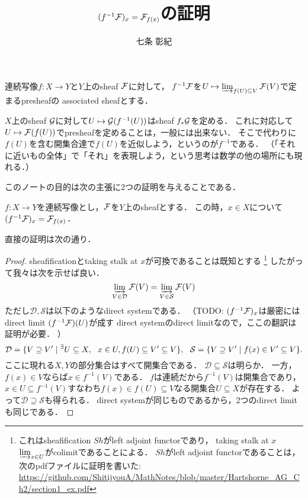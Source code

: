 \documentclass[a4paper]{jsarticle}
\title{$(f^{-1}\mathcal{F})_x=\mathcal{F}_{f(x)}$の証明}
\author{七条 彰紀}
\newcommand{\ftorSh}{\mathit{Sh}}
\begin{document}
\maketitle

\begin{Def}
    連続写像$f: X \to Y$と$Y$上のsheaf $\mathcal{F}$に対して，
    $f^{-1} \mathcal{F}$を$U \mapsto \varinjlim_{f(U) \subseteq V} \mathcal{F}(V)$で定まるpresheafの
    associated sheafとする．
\end{Def}

$X$上のsheaf $\mathcal{G}$に対して$U \mapsto \mathcal{G}(f^{-1}(U))$はsheaf $f_*\mathcal{G}$を定める．
これに対応して$U \mapsto \mathcal{F}(f(U))$でpresheafを定めることは，一般には出来ない．
そこで代わりに$f(U)$を含む開集合達で$f(U)$を近似しよう，というのが$f^{-1}$である．
（「それに近いもの全体」で「それ」を表現しよう，という思考は数学の他の場所にも現れる．）

このノートの目的は次の主張に$2$つの証明を与えることである．
\begin{Prop}[$*$]
    $f: X \to Y$を連続写像とし，$\mathcal{F}$を$Y$上のsheafとする．
    この時，$x \in X$について$(f^{-1}\mathcal{F})_x=\mathcal{F}_{f(x)}$．
\end{Prop}

直接の証明は次の通り．
\begin{proof}
    sheafificationとtaking stalk at $x$が可換であることは既知とする
    \footnote
    {
        これはsheafification $\ftorSh$がleft adjoint functorであり，
        taking stalk at $x$ $\varinjlim_{x \in U}$がcolimitであることによる．
        $\ftorSh$がleft adjoint functorであることは，
        次のpdfファイルに証明を書いた:
        \url{https://github.com/ShitijyouA/MathNotes/blob/master/Hartshorne_AG_Ch2/section1_ex.pdf}
    }
    したがって我々は次を示せば良い．
    \[ \varinjlim_{V \in \mathcal{D}} \mathcal{F}(V)=\varinjlim_{V \in \mathcal{S}} \mathcal{F}(V) \]
    ただし$\mathcal{D}, \mathcal{S}$は以下のようなdirect systemである．
    （TODO:
        $(f^{-1}\mathcal{F})_x$は厳密にはdirect limit $(f^{-1}\mathcal{F})(U)$が成す
        direct systemのdirect limitなので，ここの翻訳は証明が必要．
    ）
    \[
        \mathcal{D}=\{ V \supseteq V' \mid {}^{\exists} U \subseteq X,~~ x \in U, f(U) \subseteq V' \subseteq V \},~~
        \mathcal{S}=\{ V \supseteq V' \mid f(x) \in V' \subseteq V \}.
    \]
    ここに現れる$X,Y$の部分集合はすべて開集合である．
    $\mathcal{D} \subseteq \mathcal{S}$は明らか．
    一方，$f(x) \in V$ならば$x \in f^{-1}(V)$である．
    $f$は連続だから$f^{-1}(V)$は開集合であり，
    $x \in U \subseteq f^{-1}(V)$すなわち$f(x) \in f(U) \subseteq V$なる開集合$U \subseteq X$が存在する．
    よって$\mathcal{D} \supseteq \mathcal{S}$も得られる．
    direct systemが同じものであるから，2つのdirect limitも同じである．
\end{proof}
\end{document}
